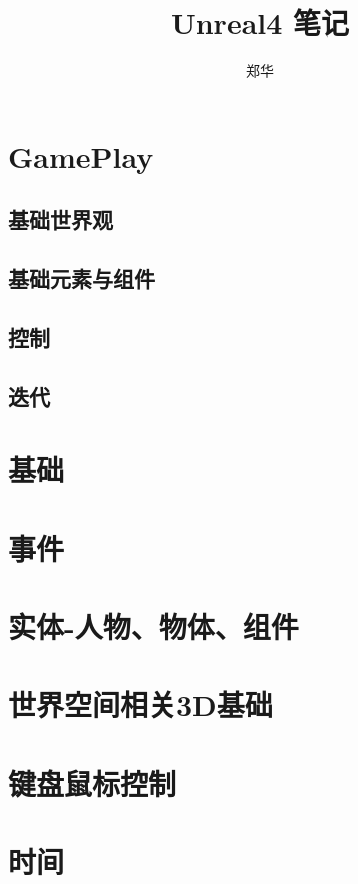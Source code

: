 \documentclass[UTF8,a4paper,12pt]{ctexbook}
\author{\kaishu 郑华}
\title{\heiti Unreal4 笔记}
\begin{document}
 	\maketitle
 	\tableofcontents


\chapter{GamePlay}
	\section{基础世界观}
	
	\section{基础元素与组件}
	
	\section{控制}
	
	\section{迭代}
	

\chapter{基础}
		
\chapter{事件}

\chapter{实体-人物、物体、组件}
		
\chapter{世界空间相关3D基础}

\chapter{键盘鼠标控制}

\chapter{时间}
\end{document}
